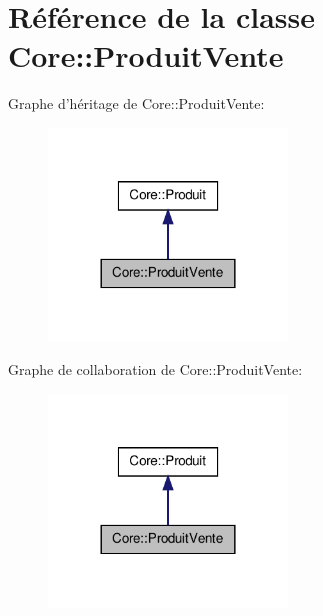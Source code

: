 \hypertarget{class_core_1_1_produit_vente}{
\section{Référence de la classe Core::ProduitVente}
\label{d3/d4f/class_core_1_1_produit_vente}
}


Graphe d'héritage de Core::ProduitVente:\nopagebreak
\begin{figure}[H]
\begin{center}
\leavevmode
\includegraphics[width=180pt]{d1/d35/class_core_1_1_produit_vente__inherit__graph}
\end{center}
\end{figure}


Graphe de collaboration de Core::ProduitVente:\nopagebreak
\begin{figure}[H]
\begin{center}
\leavevmode
\includegraphics[width=180pt]{da/d70/class_core_1_1_produit_vente__coll__graph}
\end{center}
\end{figure}
